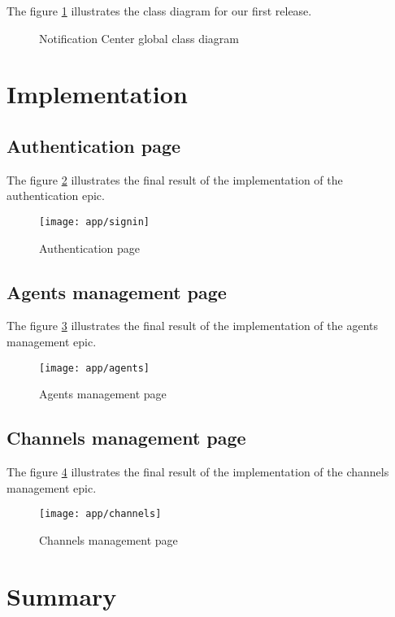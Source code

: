 The figure \ref{g-class} illustrates the class diagram for our first release.

\begin{figure}[hbt!]
    \centering
    
    \caption{Notification Center global class diagram}
    \label{g-class}
\end{figure}

\section{Implementation}
\subsection{Authentication page}
The figure \ref{ss-signin} illustrates the final result of the implementation of the authentication epic.
\begin{figure}[hbt!]
    \centering
    \texttt{[image: app/signin]}
    \caption{Authentication page}
    \label{ss-signin}
\end{figure}

\subsection{Agents management page}
The figure \ref{ss-agents} illustrates the final result of the implementation of the agents management epic.
\begin{figure}[hbt!]
    \centering
    \texttt{[image: app/agents]}
    \caption{Agents management page}
    \label{ss-agents}
\end{figure}

\subsection{Channels management page}
The figure \ref{ss-channels} illustrates the final result of the implementation of the channels management epic.
\begin{figure}[hbt!]
    \centering
    \texttt{[image: app/channels]}
    \caption{Channels management page}
    \label{ss-channels}
\end{figure}

\section*{Summary}
